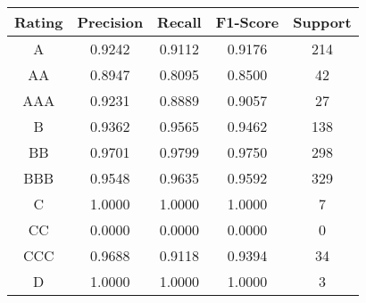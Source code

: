 \footnotesize
\begin{tabular}{ccccc}
\toprule
Rating & Precision & Recall & F1-Score & Support \\
\midrule
A & 0.9242 & 0.9112 & 0.9176 & 214 \\
AA & 0.8947 & 0.8095 & 0.8500 & 42 \\
AAA & 0.9231 & 0.8889 & 0.9057 & 27 \\
B & 0.9362 & 0.9565 & 0.9462 & 138 \\
BB & 0.9701 & 0.9799 & 0.9750 & 298 \\
BBB & 0.9548 & 0.9635 & 0.9592 & 329 \\
C & 1.0000 & 1.0000 & 1.0000 & 7 \\
CC & 0.0000 & 0.0000 & 0.0000 & 0 \\
CCC & 0.9688 & 0.9118 & 0.9394 & 34 \\
D & 1.0000 & 1.0000 & 1.0000 & 3 \\
\bottomrule
\end{tabular}

\normalsize